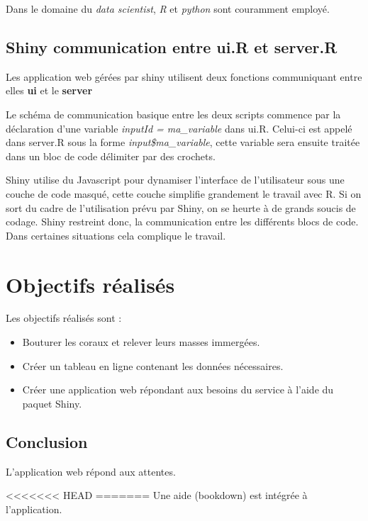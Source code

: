\documentclass[]{report}
\begin{document}
Dans le domaine du \emph{data scientist}, \emph{R} et \emph{python} sont
couramment employé.

\subsection{Shiny communication entre ui.R et
server.R}\label{shiny-communication-entre-ui.r-et-server.r}

Les application web gérées par shiny utilisent deux fonctions
communiquant entre elles \textbf{ui} et le \textbf{server}

Le schéma de communication basique entre les deux scripts commence par
la déclaration d'une variable \emph{inputId = ma\_variable} dans ui.R.
Celui-ci est appelé dans server.R sous la forme
\emph{input\$ma\_variable}, cette variable sera ensuite traitée dans un
bloc de code délimiter par des crochets.

Shiny utilise du Javascript pour dynamiser l'interface de l'utilisateur
sous une couche de code masqué, cette couche simplifie grandement le
travail avec R. Si on sort du cadre de l'utilisation prévu par Shiny, on
se heurte à de grands soucis de codage. Shiny restreint donc, la
communication entre les différents blocs de code. Dans certaines
situations cela complique le travail.

\section{Objectifs réalisés}\label{objectifs-realises}

Les objectifs réalisés sont :

\begin{itemize}
\item
  Bouturer les coraux et relever leurs masses immergées.
\item
  Créer un tableau en ligne contenant les données nécessaires.
\item
  Créer une application web répondant aux besoins du service à l'aide du
  paquet Shiny.
\end{itemize}

\subsection{Conclusion}\label{conclusion}

L'application web répond aux attentes.

<<<<<<< HEAD
=======
Une aide (bookdown) est intégrée à l'application.
\end{document}
